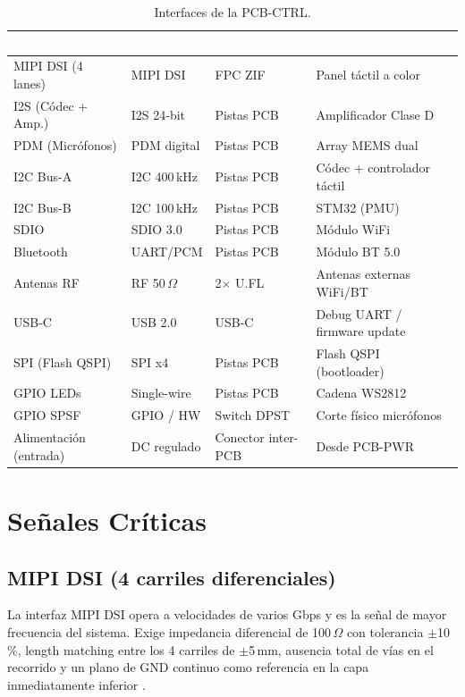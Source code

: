 \begin{table}[H]
  \centering
  \caption{Interfaces de la PCB-CTRL.}
  \label{tab:interfaces_ctrl}
  \begin{tabularx}{\textwidth}{L{3cm} C{2.5cm} C{2cm} L{5cm}}
    \toprule
    \textcolor{white}{\textbf{Interfaz}} &
    \textcolor{white}{\textbf{Protocolo}} &
    \textcolor{white}{\textbf{Conector}} &
    \textcolor{white}{\textbf{Destino / Función}} \\
    \midrule
    MIPI DSI (4 lanes) & MIPI DSI & FPC ZIF & Panel táctil a color \\
    I2S (Códec + Amp.) & I2S 24-bit & Pistas PCB & Amplificador Clase D \\
    PDM (Micrófonos) & PDM digital & Pistas PCB & Array MEMS dual \\
    I2C Bus-A & I2C 400\,kHz & Pistas PCB & Códec + controlador táctil \\
    I2C Bus-B & I2C 100\,kHz & Pistas PCB & STM32 (PMU) \\
    SDIO & SDIO 3.0 & Pistas PCB & Módulo WiFi \\
    Bluetooth & UART/PCM & Pistas PCB & Módulo BT 5.0 \\
    Antenas RF & RF 50\,$\Omega$ & 2$\times$ U.FL & Antenas externas WiFi/BT \\
    USB-C & USB 2.0 & USB-C & Debug UART / firmware update \\
    SPI (Flash QSPI) & SPI x4 & Pistas PCB & Flash QSPI (bootloader) \\
    GPIO LEDs & Single-wire & Pistas PCB & Cadena WS2812 \\
    GPIO SPSF & GPIO / HW & Switch DPST & Corte físico micrófonos \\
    Alimentación (entrada) & DC regulado & Conector inter-PCB & Desde PCB-PWR \\
    \bottomrule
  \end{tabularx}
\end{table}

\section{Señales Críticas}
\label{sec:ctrl_senales}

\subsection{MIPI DSI (4 carriles diferenciales)}
La interfaz MIPI DSI opera a velocidades de varios Gbps y es la señal de mayor frecuencia del sistema. Exige impedancia diferencial de 100\,$\Omega$ con tolerancia $\pm$10\,\%, length matching entre los 4 carriles de $\pm$5\,mm, ausencia total de vías en el recorrido y un plano de GND continuo como referencia en la capa inmediatamente inferior .

